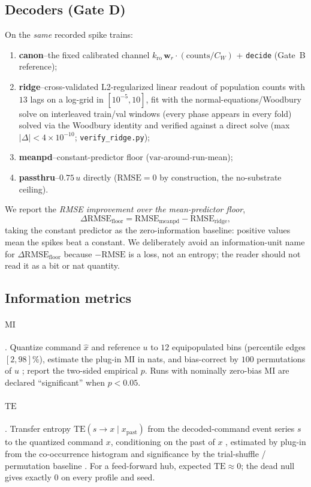 \documentclass[10pt,a4paper]{article}
\newcommand{\RMSE}{\ensuremath{\mathrm{RMSE}}}
\newcommand{\MI}{\ensuremath{\mathrm{MI}}}
\newcommand{\TE}{\ensuremath{\mathrm{TE}}}
\newcommand{\dfloor}{\ensuremath{\Delta\RMSE_{\mathrm{floor}}}}
\newcommand{\palt}{0.75\,u}          %
\begin{document}
\subsection{Decoders (Gate D)}\label{sec:decoders}

On the \emph{same} recorded spike trains:
\begin{enumerate}[nosep]
\item \textbf{canon}--the fixed calibrated channel
$k_{\mathrm{ro}}\,\mathbf{w}_r\!\cdot(\mathrm{counts}/C_W)$ +
\texttt{decide} (Gate~B reference);
\item \textbf{ridge}--cross-validated L2-regularized linear readout of
population counts with $13$ lags on a log-grid in
$[10^{-5},10]$, fit with the normal-equations/Woodbury solve on
interleaved train/val windows (every phase appears in every fold)
solved via the Woodbury identity and verified against a direct solve
(max $|\Delta|<4\times10^{-10}$; \texttt{verify\_ridge.py});
\item \textbf{meanpd}--constant-predictor floor
($\mathrm{var}$-around-run-mean);
\item \textbf{passthru}--$\palt$ directly ($\RMSE=0$ by construction,
the no-substrate ceiling).
\end{enumerate}
We report the \emph{RMSE improvement over the mean-predictor floor},
\[
\dfloor = \RMSE_{\mathrm{meanpd}}-\RMSE_{\mathrm{ridge}},
\]
taking the constant predictor as the zero-information baseline:
positive values mean the spikes beat a constant. We deliberately avoid
an information-unit name for $\dfloor$ because $-\RMSE$ is a loss, not
an entropy; the reader should not read it as a bit or nat quantity.

\subsection{Information metrics}\label{sec:metrics}

\paragraph{$\MI$}. Quantize command $\hat{x}$ and reference $u$ to
$12$ equipopulated bins (percentile edges $[2,98]\%$), estimate the
plug-in $\MI$ in nats, and bias-correct by $100$ permutations of $u$
\cite{panzeri2007}; report the two-sided empirical $p$. Runs with
nominally zero-bias MI are declared ``significant'' when $p<0.05$.

\paragraph{$\TE$}. Transfer entropy $\TE(s\to x\mid x_{\mathrm{past}})$
from the decoded-command event series $s$ to the quantized command
$x$, conditioning on the past of $x$ \cite{schreiber2000}, estimated by
plug-in from the co-occurrence histogram and significance by the
trial-shuffle / permutation baseline \cite{walker2018}. For a
feed-forward hub, expected $\TE\approx0$; the dead null gives exactly
$0$ on every profile and seed.
\end{document}
